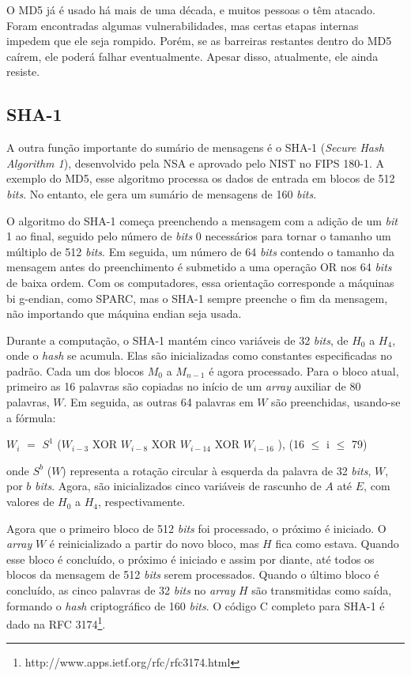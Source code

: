 \documentclass{abnt}
\begin{document}
O MD5 já é usado há mais de uma década, e muitos pessoas o têm atacado. Foram encontradas algumas vulnerabilidades, mas certas etapas internas impedem que ele seja rompido. Porém,
se as barreiras restantes dentro do MD5 caírem, ele poderá falhar eventualmente. Apesar disso, atualmente, ele ainda resiste.


\subsection{SHA-1}

A outra função importante do sumário de mensagens é o SHA-1 (\textit{Secure Hash Algorithm 1}), desenvolvido pela NSA e aprovado pelo NIST no FIPS 180-1. A exemplo do MD5, esse
algoritmo processa os dados de entrada em blocos de 512 \textit{bits}. No entanto, ele gera um sumário de mensagens de 160 \textit{bits}.

O algoritmo do SHA-1 começa preenchendo a mensagem com a adição de um \textit{bit} 1 ao final, seguido pelo número de \textit{bits} 0 necessários para tornar o tamanho um múltiplo
de 512 \textit{bits}. Em seguida, um número de 64 \textit{bits} contendo o tamanho da mensagem antes do preenchimento é submetido a uma operação OR nos 64 \textit{bits} de baixa
ordem. Com os computadores, essa orientação corresponde a máquinas bi g-endian, como SPARC, mas o SHA-1 sempre preenche o fim da mensagem, não importando que máquina endian seja usada.

Durante a computação, o SHA-1 mantém cinco variáveis de 32 \textit{bits}, de $H_0$ a $H_4$, onde o \textit{hash} se acumula. Elas são inicializadas como constantes especificadas no
padrão. Cada um dos blocos $M_0$ a $M_{n-1}$ é agora processado. Para o bloco atual, primeiro as 16 palavras são copiadas no início de um \textit{array} auxiliar de 80 palavras, $W$.
Em seguida, as outras 64 palavras em $W$ são preenchidas, usando-se a fórmula:

$W_i$ $=$ $S^1$ ($W_{i-3}$ XOR $W_{i-8}$ XOR $W_{i-14}$ XOR $W_{i-16}$ ), (16 $\le$ i $\le$ 79)


onde $S^b$ ($W$) representa a rotação circular à esquerda da palavra de 32 \textit{bits}, $W$, por $b$ \textit{bits}. Agora, são inicializados cinco variáveis de rascunho de $A$ até $E$,
com valores de $H_0$ a $H_4$, respectivamente.


Agora que o primeiro bloco de 512 \textit{bits} foi processado, o próximo é iniciado. O \textit{array} $W$ é reinicializado a partir do novo bloco, mas $H$ fica como estava. Quando esse
bloco é concluído, o próximo é iniciado e assim por diante, até todos os blocos da mensagem de 512 \textit{bits} serem processados. Quando o último bloco é concluído, as cinco
palavras de 32 \textit{bits} no \textit{array} $H$ são transmitidas como saída, formando o \textit{hash} criptográfico de 160 \textit{bits}. O código C completo para SHA-1 é dado na
RFC 3174\footnote{http://www.apps.ietf.org/rfc/rfc3174.html}.
\end{document}
